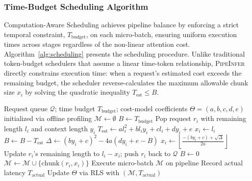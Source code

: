 \documentclass[12pt,a4paper]{article}
\newcommand{\sys}{\textsc{PipeInfer}\xspace}
\newcommand{\Timesched}{Computation-Aware Scheduling\xspace}
\begin{document}
\subsubsection{Time-Budget Scheduling Algorithm}

\Timesched achieves pipeline balance by enforcing a strict temporal constraint, $T_{\mathrm{budget}}$, on each micro-batch, ensuring uniform execution times across stages regardless of the non-linear attention cost.
Algorithm~\ref{alg:scheduling} presents the scheduling procedure.
Unlike traditional token-budget schedulers that assume a linear time-token relationship, \sys directly constrains execution time: when a request's estimated cost exceeds the remaining budget, the scheduler reverse-calculates the maximum allowable chunk size $x_i$ by solving the quadratic inequality $T_{\mathrm{est}} \le B$.

\begin{algorithm}[!tbp]
\small
\caption{Computation-Aware Scheduling with Time-Budget Constraint}
\label{alg:scheduling}
\begin{algorithmic}[1]
\Require Request queue $\mathcal{Q}$; time budget $T_{\mathrm{budget}}$; cost-model coefficients $\Theta = (a, b, c, d, e)$ initialized via offline profiling
 
    \State $\mathcal{M} \leftarrow \emptyset$
    \State $B \leftarrow T_{\mathrm{budget}}$
        \State Pop request $r_i$ with remaining length $l_i$ and context length $y_i$
        \State $T_{\mathrm{est}} \leftarrow a l_i^2 + b l_i y_i + c l_i + d y_i + e$
            \State $x_i \leftarrow l_i$
            \State $B \leftarrow B - T_{\mathrm{est}}$
        \Else {}
            \State $\Delta \leftarrow (b y_i + c)^2 - 4a(d y_i + e - B)$
            \State $x_i \leftarrow \left\lfloor \frac{-(b y_i + c) + \sqrt{\Delta}}{2a} \right\rfloor$
            \State Update $r_i$'s remaining length to $l_i - x_i$; push $r_i$ back to $\mathcal{Q}$
            \State $B \leftarrow 0$
        \EndIf
        \State $\mathcal{M} \leftarrow \mathcal{M} \cup \{ \text{chunk}(r_i, x_i) \}$
    \EndWhile
    \State Execute micro-batch $\mathcal{M}$ on pipeline
        \State Record actual latency $T_{\mathrm{actual}}$
        \State Update $\Theta$ via RLS with $(\mathcal{M}, T_{\mathrm{actual}})$
    \EndIf
\EndWhile
\end{algorithmic}
\end{algorithm}
\end{document}
